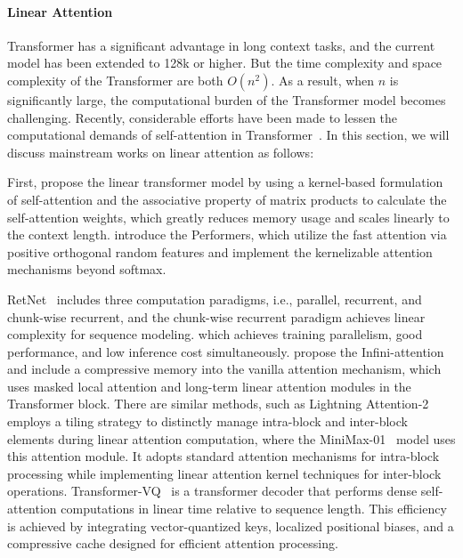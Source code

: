 \documentclass[11pt, a4paper, logo, copyright, nonumbering]{map}
\begin{document}
\paragraph{Linear Attention}

Transformer has a significant advantage in long context tasks, and the current model has been extended to 128k or higher. But the time complexity and space complexity of the Transformer are both $O(n^2)$. As a result, when $n$ is significantly large, the computational burden of the Transformer model becomes challenging. Recently, considerable efforts have been made to lessen the computational demands of self-attention in Transformer~\citep{shen2021efficient, qin2022cosformerrethinkingsoftmaxattention, han2023flattentransformervisiontransformer, arora2024simplelinearattentionlanguage, xiong2021nystromformernystrombasedalgorithmapproximating}. {In this section, we will discuss mainstream works on linear attention as follows:}

First, 
\citet{katharopoulos2020transformersrnnsfastautoregressive} propose the linear transformer model by using a kernel-based formulation~\cite{radford2018improving} of self-attention and the associative property of matrix products to calculate the
self-attention weights,
which greatly reduces memory usage and scales linearly to the context length.
\citet{choromanski2022rethinkingattentionperformers} introduce the Performers,
which utilize the  fast attention via positive orthogonal random features and implement the kernelizable
attention mechanisms beyond softmax. 

RetNet~\cite{sun2023retentivenetworksuccessortransformer} includes three computation paradigms, i.e., parallel,
recurrent, and chunk-wise recurrent, and the chunk-wise recurrent paradigm achieves linear complexity for sequence modeling.
which achieves training parallelism, good performance, and low inference cost simultaneously.
\citet{munkhdalai2024leavecontextbehindefficient} propose the Infini-attention and include a compressive memory into the vanilla attention mechanism,
which uses  masked local attention and long-term linear attention modules in the Transformer block.
There are similar methods, such as
Lightning Attention-2~\citep{qin2024lightningattention2freelunch} employs a tiling strategy to distinctly manage intra-block and inter-block elements during linear attention computation,
where the MiniMax-01~\citep{minimax2025minimax01scalingfoundationmodels} model uses this attention module. It adopts standard attention mechanisms for intra-block processing while implementing linear attention kernel techniques for inter-block operations.
Transformer-VQ~\citep{lingle2024transformervqlineartimetransformersvector}  is a transformer decoder that performs dense self-attention computations in linear time relative to sequence length. This efficiency is achieved by integrating vector-quantized keys, localized positional biases, and a compressive cache designed for efficient attention processing.
\end{document}
